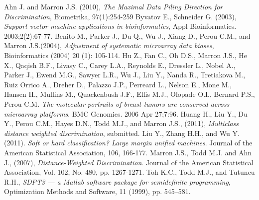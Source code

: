 \documentclass{bioinfo}
\begin{document}
\begin{thebibliography}{}

Ahn J. and Marron J.S. (2010),
  \textit{The Maximal Data Piling Direction for Discrimination},
  Biometrika, 97(1):254-259
Byvatov E., Schneider G. (2003),
  \textit{Support vector machine applications in bioinformatics}, Appl
  Bioinformatics. 2003;2(2):67-77.
Benito M., Parker J., Du Q., Wu J.,
  Xiang D., Perou C.M., and Marron J.S.(2004), \textit{Adjustment of
    systematic microarray data biases}, Bioinformatics (2004) 20 (1):
  105-114.
Hu Z., Fan C., Oh D.S., Marron J.S., He X.,
  Qaqish B.F., Livasy C., Carey L.A., Reynolds E., Dressler L., Nobel
  A., Parker J., Ewend M.G., Sawyer L.R., Wu J., Liu Y., Nanda R.,
  Tretiakova M., Ruiz Orrico A., Dreher D., Palazzo J.P., Perreard L.,
  Nelson E., Mone M., Hansen H., Mullins M., Quackenbush J.F., Ellis
  M.J., Olopade O.I., Bernard P.S., Perou C.M. \textit{The molecular
    portraits of breast tumors are conserved across microarray
    platforms}. BMC Genomics. 2006 Apr 27;7:96.
Huang H., Liu Y., Du Y., Perou C.M.,
  Hayes D.N., Todd M.J., and Marron J.S., (2011), \textit{Multiclass
    distance weighted discrimination}, submitted.
Liu Y., Zhang H.H., and Wu Y. (2011).
  \textit{Soft or hard classification? Large margin unified
    machines}. Journal of the American Statistical Association, 106,
  166-177.
 Marron J.S., Todd M.J. and Ahn J.,
  (2007), \textit{Distance-Weighted Discrimination}. Journal of the
  American Statistical Association, Vol. 102, No. 480, pp. 1267-1271.
Toh K.C., Todd M.J., and Tutuncu R.H.,
  \textit{SDPT3 --- a Matlab software package for semidefinite
    programming}, Optimization Methods and Software, 11 (1999),
  pp. 545--581.

\end{thebibliography}
\end{document}
